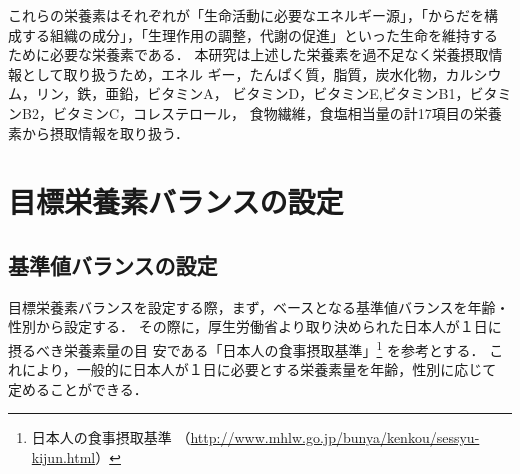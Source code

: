 \documentclass[11pt,titlepage,uplatex]{ujreport}
\begin{document}
これらの栄養素はそれぞれが「生命活動に必要なエネルギー源」，「からだを構
成する組織の成分」，「生理作用の調整，代謝の促進」といった生命を維持する
ために必要な栄養素である．
本研究は上述した栄養素を過不足なく栄養摂取情報として取り扱うため，エネル
ギー，たんぱく質，脂質，炭水化物，カルシウム，リン，鉄，亜鉛，ビタミンA，
ビタミンD，ビタミンE,ビタミンB1，ビタミンB2，ビタミンC，コレステロール，
食物繊維，食塩相当量の計17項目の栄養素から摂取情報を取り扱う．
	
\section{目標栄養素バランスの設定}
\subsection{基準値バランスの設定}
 目標栄養素バランスを設定する際，まず，ベースとなる基準値バランスを年齢・
 性別から設定する．
その際に，厚生労働省より取り決められた日本人が１日に摂るべき栄養素量の目
安である「日本人の食事摂取基準」\footnote{日本人の食事摂取基準
（\url{http://www.mhlw.go.jp/bunya/kenkou/sessyu-kijun.html}）} を参考とする．
これにより，一般的に日本人が１日に必要とする栄養素量を年齢，性別に応じて
 定めることができる．
\end{document}
